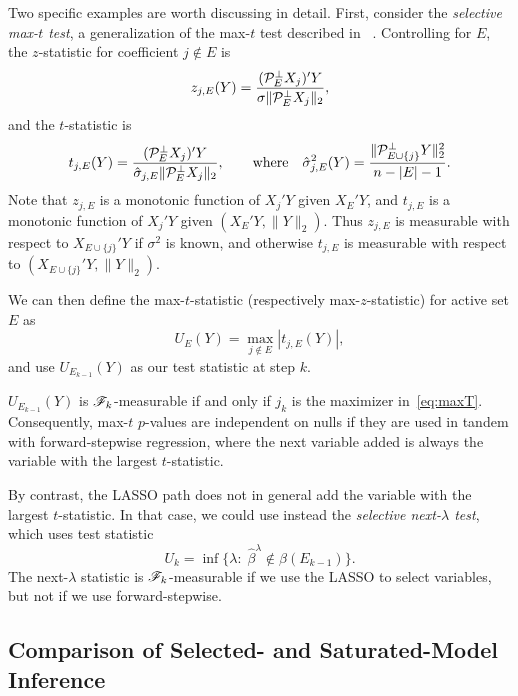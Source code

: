\documentclass{article}
\begin{document}
Two specific examples are worth discussing in detail. First, consider the {\em selective max-$t$ test}, a generalization of the max-$t$ test described in 
~\citet{buja2014}. Controlling for $E$, the $z$-statistic for coefficient $j\notin E$ is
\begin{equation}
  z_{j,E}(Y) = \frac{(\mathcal{P}_E^\perp X_j)'Y}
  {\sigma\|\mathcal{P}_{E}^\perp X_j\|_2},
\end{equation}
and the $t$-statistic is
\begin{equation}
  t_{j,E}(Y) = \frac{(\mathcal{P}_E^\perp X_j)'Y}
  {\hat \sigma_{j,E} \|\mathcal{P}_{E}^\perp X_j\|_2},
  \qquad \text{where} \quad 
  \hat \sigma_{j,E}^2(Y) = 
  \frac{\|\mathcal{P}_{E \cup \{j\}}^\perp Y\|_2^2}{n-|E|-1}.
\end{equation}
Note that $z_{j,E}$ is a monotonic function of $X_j'Y$ given $X_E'Y$, and $t_{j, E}$ is a monotonic function of $X_j'Y$ given $(X_E'Y, \|Y\|_2)$. Thus $z_{j,E}$ is measurable with respect 
to $X_{E \cup \{j\}}'Y$ if $\sigma^2$ is known, and otherwise $t_{j,E}$ is measurable with respect to $(X_{E \cup \{j\}}'Y, \|Y\|_2)$.

We can then define the max-$t$-statistic (respectively max-$z$-statistic) for active set $E$ as
\begin{equation}\label{eq:maxT}
  U_E(Y) = \max_{j \notin E} \left|t_{j,E}(Y)\right|,
\end{equation}
and use $U_{E_{k-1}}(Y)$ as our test statistic at step $k$.

$U_{E_{k-1}}(Y)$ is $\mathscr{F}_k$-measurable if and only if $j_k$ is the maximizer in~\eqref{eq:maxT}. Consequently, max-$t$ $p$-values are independent on nulls if they are used in tandem with forward-stepwise regression, where the next variable added is always the variable with the largest $t$-statistic.

By contrast, the LASSO path does not in general add the variable with the largest $t$-statistic. In that case, we could use instead the {\em selective next-$\lambda$ test}, which uses test statistic
\begin{equation}
  U_k = \inf\{ \lambda:\; \hat\beta^\lambda \notin \beta(E_{k-1})\}.
\end{equation}
The next-$\lambda$ statistic is $\mathscr{F}_k$-measurable if we use the LASSO to select variables, but not if we use forward-stepwise. 


\subsection{Comparison of Selected- and Saturated-Model Inference}\label{sec:bivariate}
\end{document}
